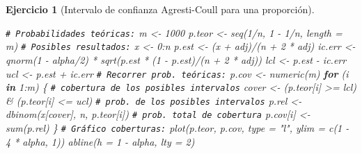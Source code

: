 \documentclass[
  10pt,
]{book}
\newenvironment{Shaded}{\begin{snugshade}}{\end{snugshade}}
\newcommand{\AttributeTok}[1]{\textcolor[rgb]{0.77,0.63,0.00}{#1}}
\newcommand{\CommentTok}[1]{\textcolor[rgb]{0.56,0.35,0.01}{\textit{#1}}}
\newcommand{\ControlFlowTok}[1]{\textcolor[rgb]{0.13,0.29,0.53}{\textbf{#1}}}
\newcommand{\DecValTok}[1]{\textcolor[rgb]{0.00,0.00,0.81}{#1}}
\newcommand{\FunctionTok}[1]{\textcolor[rgb]{0.00,0.00,0.00}{#1}}
\newcommand{\NormalTok}[1]{#1}
\newcommand{\OtherTok}[1]{\textcolor[rgb]{0.56,0.35,0.01}{#1}}
\newcommand{\SpecialCharTok}[1]{\textcolor[rgb]{0.00,0.00,0.00}{#1}}
\newcommand{\StringTok}[1]{\textcolor[rgb]{0.31,0.60,0.02}{#1}}
\theoremstyle{break}
\newtheorem{exercise}{Ejercicio}[chapter]
\theoremstyle{nonumberplain}
\renewcommand{\CommentTok}[1]{\textcolor[rgb]{0.41,0.41,0.41}{\texttt{#1}}}
\begin{document}
\begin{exercise}[Intervalo de confianza Agresti-Coull para una proporción]
\begin{enumerate}
\begin{Shaded}
\begin{Highlighting}[]
\CommentTok{\# Probabilidades teóricas:}
\NormalTok{m }\OtherTok{\textless{}{-}} \DecValTok{1000}
\NormalTok{p.teor }\OtherTok{\textless{}{-}} \FunctionTok{seq}\NormalTok{(}\DecValTok{1}\SpecialCharTok{/}\NormalTok{n, }\DecValTok{1} \SpecialCharTok{{-}} \DecValTok{1}\SpecialCharTok{/}\NormalTok{n, }\AttributeTok{length =}\NormalTok{ m) }
\CommentTok{\# Posibles resultados:}
\NormalTok{x }\OtherTok{\textless{}{-}} \DecValTok{0}\SpecialCharTok{:}\NormalTok{n}
\NormalTok{p.est }\OtherTok{\textless{}{-}}\NormalTok{ (x }\SpecialCharTok{+}\NormalTok{ adj)}\SpecialCharTok{/}\NormalTok{(n }\SpecialCharTok{+} \DecValTok{2} \SpecialCharTok{*}\NormalTok{ adj) }
\NormalTok{ic.err }\OtherTok{\textless{}{-}} \FunctionTok{qnorm}\NormalTok{(}\DecValTok{1} \SpecialCharTok{{-}}\NormalTok{ alpha}\SpecialCharTok{/}\DecValTok{2}\NormalTok{) }\SpecialCharTok{*} \FunctionTok{sqrt}\NormalTok{(p.est }\SpecialCharTok{*}\NormalTok{ (}\DecValTok{1} \SpecialCharTok{{-}}\NormalTok{ p.est)}\SpecialCharTok{/}\NormalTok{(n }\SpecialCharTok{+} \DecValTok{2} \SpecialCharTok{*}\NormalTok{ adj))  }
\NormalTok{lcl }\OtherTok{\textless{}{-}}\NormalTok{ p.est }\SpecialCharTok{{-}}\NormalTok{ ic.err }
\NormalTok{ucl }\OtherTok{\textless{}{-}}\NormalTok{ p.est }\SpecialCharTok{+}\NormalTok{ ic.err }
\CommentTok{\# Recorrer prob. teóricas:}
\NormalTok{p.cov }\OtherTok{\textless{}{-}} \FunctionTok{numeric}\NormalTok{(m)}
\ControlFlowTok{for}\NormalTok{ (i }\ControlFlowTok{in} \DecValTok{1}\SpecialCharTok{:}\NormalTok{m) \{}
  \CommentTok{\# cobertura de los posibles intervalos}
\NormalTok{  cover }\OtherTok{\textless{}{-}}\NormalTok{ (p.teor[i] }\SpecialCharTok{\textgreater{}=}\NormalTok{ lcl) }\SpecialCharTok{\&}\NormalTok{ (p.teor[i] }\SpecialCharTok{\textless{}=}\NormalTok{ ucl)  }
  \CommentTok{\# prob. de los posibles intervalos}
\NormalTok{  p.rel }\OtherTok{\textless{}{-}} \FunctionTok{dbinom}\NormalTok{(x[cover], n, p.teor[i])           }
  \CommentTok{\# prob. total de cobertura}
\NormalTok{  p.cov[i] }\OtherTok{\textless{}{-}} \FunctionTok{sum}\NormalTok{(p.rel)                            }
\NormalTok{\}}
\CommentTok{\# Gráfico coberturas:}
\FunctionTok{plot}\NormalTok{(p.teor, p.cov, }\AttributeTok{type =} \StringTok{"l"}\NormalTok{, }\AttributeTok{ylim =} \FunctionTok{c}\NormalTok{(}\DecValTok{1} \SpecialCharTok{{-}} \DecValTok{4} \SpecialCharTok{*}\NormalTok{ alpha, }\DecValTok{1}\NormalTok{))}
\FunctionTok{abline}\NormalTok{(}\AttributeTok{h =} \DecValTok{1} \SpecialCharTok{{-}}\NormalTok{ alpha, }\AttributeTok{lty =} \DecValTok{2}\NormalTok{) }
\end{Highlighting}
\end{Shaded}


\end{enumerate}
\end{exercise}
\end{document}
